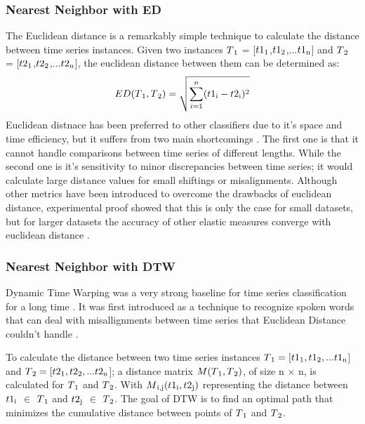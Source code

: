 \subsubsection{Nearest Neighbor with ED}
The Euclidean distance is a remarkably simple technique to calculate the distance between time series instances.
Given two instances  $T\textsubscript{1}$ = [$t1\textsubscript{1}$,$t1\textsubscript{2}$,...$t1\textsubscript{n}$]
and $T\textsubscript{2}$ = [$t2\textsubscript{1}$,$t2\textsubscript{2}$,...$t2\textsubscript{n}$], the euclidean distance
between them can be determined as:
\begin{equation}
    ED(T\textsubscript{1},T\textsubscript{2})= \sqrt{\sum_{i=1}^{n} (t1\textsubscript{i} - t2\textsubscript{i})^{2}}
\end{equation}
Euclidean distnace has been preferred to other classifiers due to it's space and time efficiency, but it suffers from two main shortcomings \cite{baydogan2013bag, jeong2011weighted,kate2016using}.
The first one is that it cannot handle comparisons between time series of different lengths.
While the second one is it's sensitivity to minor discrepancies between time series; it would calculate large distance values for small shiftings or misalignments.
Although other metrics have been introduced to overcome the drawbacks of euclidean distance,
experimental proof showed that this is only the case for small datasets, but for larger datasets the accuracy of other elastic measures
converge with euclidean distance \cite{hills2014classification,ding2008querying,bagnall2012transformation}.


\subsubsection{Nearest Neighbor with DTW}
Dynamic Time Warping was a very strong baseline for time series classification for a long time \cite{abanda2019review,bagnall2017great}.
It was first introduced as a technique to recognize spoken words that can deal with misallignments between time series
that Euclidean Distance couldn't handle \cite{tan2020fastee}.

To calculate the distance between two time series instances  $T\textsubscript{1} = [t1\textsubscript{1},t1\textsubscript{2},...t1\textsubscript{n}$]
and $T\textsubscript{2} = [t2\textsubscript{1},t2\textsubscript{2},...t2\textsubscript{n}$];
a distance matrix $M(T\textsubscript{1},T\textsubscript{2})$, of size n $\times$ n, is calculated for $T\textsubscript{1}$ and $T\textsubscript{2}$.
With $M\textsubscript{i,j}(t1\textsubscript{i},t2\textsubscript{j})$ representing the distance between $t1\textsubscript{i}$ $\in$ $T\textsubscript{1}$
and $t2\textsubscript{j}$ $\in$ $T\textsubscript{2}$.
The goal of DTW is to find an optimal path that minimizes the cumulative distance between points of $T\textsubscript{1}$ and $T\textsubscript{2}$.

